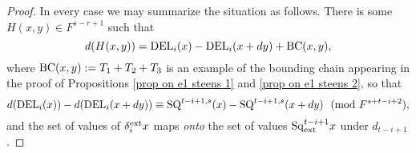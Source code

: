 \documentclass[11pt]{amsart} \renewcommand{\baselinestretch}{1.2}
\theoremstyle{plain}
\newtheorem{cor}[thm]{Corollary}
\numberwithin{equation}{section} %
\theoremstyle{plain}
\newtheorem{cor}[thm]{Corollary}
\numberwithin{equation}{chapter} %
\newcommand{\Sq}{\mathrm{Sq}}
\newcommand{\E}[5]{[E^{#1}_{#2}#3]^{#4}_{#5}}
\begin{document}
\begin{second quadrant homotopy sseq operations}
\begin{proof}
In every case we may summarize the situation as follows. There is some $H(x,y)\in F^{s-r+1}$ such that
\[
d(H(x,y))
=
\textup{DEL}_i(x)-\textup{DEL}_i(x+dy)+\textup{BC}(x,y),%
\]
where $\textup{BC}(x,y):=T_1+T_2+T_3$ is an example of the bounding chain appearing in the proof of Propositions \ref{prop on e1 steens 1} and \ref{prop on e1 steens 2}, so that
\[d(\textup{DEL}_i(x))-d(\textup{DEL}_i(x+dy))
\equiv
\textup{SQ}^{t-i+1,s}(x)-\textup{SQ}^{t-i+1,s}(x+dy) \textup{\ \ (mod $F^{s+t-i+2}$)},\]
%
and the set of values of $\delta_i^\textup{ext}x$ maps \emph{onto} the set of values $\Sq_\textup{ext}^{t-i+1}x$ under $d_{t-i+1}$.
\end{proof}
%
%


\end{second quadrant homotopy sseq operations}
\end{document}
